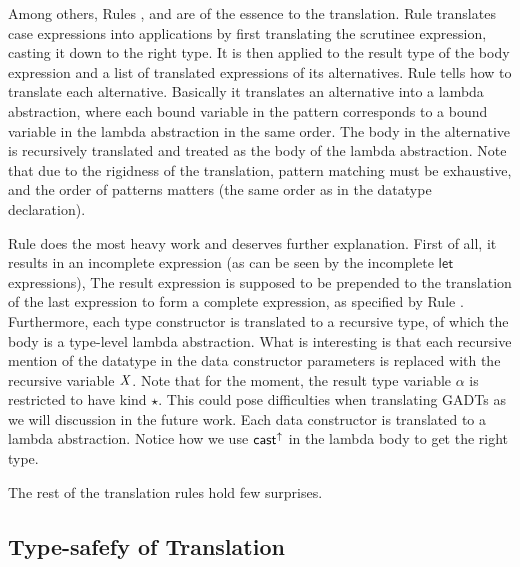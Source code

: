 Among others, Rules ,  and
 are of the essence to the translation. Rule
 translates case expressions into applications by
first translating the scrutinee expression, casting it down to the
right type. It is then applied to the result type of the body
expression and a list of translated \name expressions of its
alternatives. Rule  tells how to translate each
alternative. Basically it translates an alternative into a lambda
abstraction, where each bound variable in the pattern corresponds to a
bound variable in the lambda abstraction in the same order. The body
in the alternative is recursively translated and treated as the body
of the lambda abstraction. Note that due to the rigidness of the
translation, pattern matching must be exhaustive, and the order of
patterns matters (the same order as in the datatype declaration).

Rule  does the most heavy work and deserves
further explanation. First of all, it results in an incomplete
expression (as can be seen by the incomplete $\mathsf{let}$
expressions), The result expression is supposed to be prepended to the
translation of the last expression to form a complete \name
expression, as specified by Rule . Furthermore,
each type constructor is translated to a recursive type, of which the
body is a type-level lambda abstraction. What is interesting is that
each recursive mention of the datatype in the data constructor
parameters is replaced with the recursive variable $\mathit{X}$. Note that
for the moment, the result type variable $\alpha$ is restricted to
have kind $\star$. This could pose difficulties when translating GADTs
as we will discussion in the future work. Each data constructor is
translated to a lambda abstraction. Notice how we use $ \mathsf{cast}^{\uparrow} $ in
the lambda body to get the right type.

The rest of the translation rules hold few surprises.

\subsection{Type-safefy of Translation}



